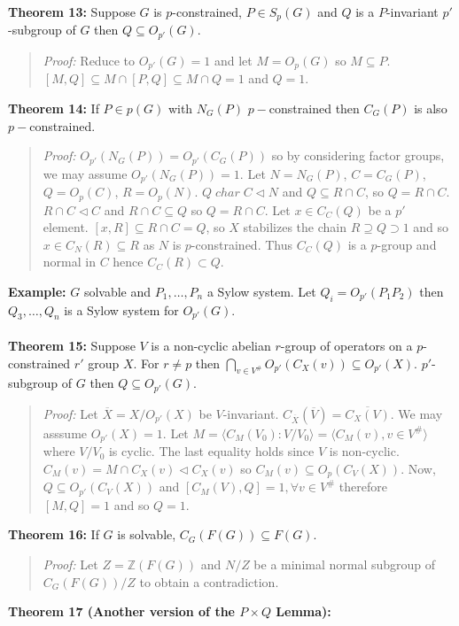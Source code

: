 {\bf Theorem 13:}  Suppose $G$ is $p$-constrained, $P \in S_p(G)$ and $Q$ is a $P$-invariant
$p'$-subgroup of $G$ then $Q \subseteq O_{p'}(G)$.
\begin{quote}
\emph{Proof:}  Reduce to $O_{p'}(G) = 1$ and let $M= O_p(G)$ so $M \subseteq P$.
$[M, Q] \subseteq M \cap [P, Q] \subseteq M \cap Q = 1$ and $Q = 1$.
\end{quote}
{\bf Theorem 14:}
If $P \in p(G)$ with $N_G(P)$ $p-$constrained then $C_G(P)$ is also $p-$constrained.
\begin{quote}
\emph{Proof:}  $O_{p'}(N_G(P)) = O_{p'}(C_G(P))$ so by considering factor groups, we may assume
$O_{p'}(N_G(P))= 1$.  Let $N= N_G(P)$, $C= C_G(P)$, $Q= O_p(C)$, $R= O_p(N)$.
$Q \; char \; C \lhd N$ and $Q \subseteq R \cap C$, so $Q= R \cap C$.
$R \cap C \lhd C$ and $ R \cap C \subseteq Q$ so $Q = R \cap C$.
Let $x \in C_C(Q)$ be a $p'$ element.   $[x, R] \subseteq R \cap C = Q$,
so $X$ stabilizes the chain $R \supseteq Q \supset 1$ and so $x \in C_N(R) \subseteq R$ as
$N$ is $p$-constrained.  Thus $C_C(Q)$ is a $p$-group and normal in $C$ hence $C_C(R) \subset Q$.
\end{quote}
{\bf Example:} $G$ solvable and $P_1, \ldots, P_n$ a Sylow system.  Let $Q_i= O_{p'}(P_1P_2)$
then $Q_3, \ldots, Q_n$ is a Sylow system for $O_{p'}(G)$.
\\
\\
{\bf Theorem 15:}  Suppose $V$ is a non-cyclic abelian $r$-group of operators on a $p$-constrained
$r'$ group $X$.  For $r \ne p$ then $\bigcap_{v \in V^{\#}} O_{p'}(C_X(v)) \subseteq O_{p'}(X)$.
$p'$-subgroup of $G$ then $Q \subseteq O_{p'}(G)$.
\begin{quote}
\emph{Proof:}  Let ${\overline X}= X/O_{p'}(X)$ be $V$-invariant.  $C_{\overline X}({\overline V}) = {\overline {C_{X}( V)}}$.  We may asssume
$O_{p'}(X) = 1$.  Let $M = \langle C_M (V_0 ): V/V_0 \rangle = \langle C_M(v), v \in V^{\#} \rangle $
where $V/V_0$ is cyclic.
The last equality holds since $V$ is non-cyclic.
$C_M(v) = M \cap C_X(v) \lhd C_X(v)$ so $C_M(v) \subseteq O_p(C_V(X))$.
Now, $Q \subseteq O_{p'}(C_V(X))$ and $[C_M(V), Q] =1, \forall v \in V^{\#}$ therefore
$[M, Q] = 1$ and so $Q = 1$.
\end{quote}
{\bf Theorem 16:}
If $G$ is solvable, $C_G(F(G)) \subseteq F(G)$.
\begin{quote}
\emph{Proof:}
Let $Z = {\mathbb Z}(F(G))$ and $N/Z$ be a minimal normal subgroup of $C_G(F(G))/Z$ to obtain a contradiction.
\end{quote}
{\bf Theorem 17 (Another version of the $P \times Q$ Lemma):}
